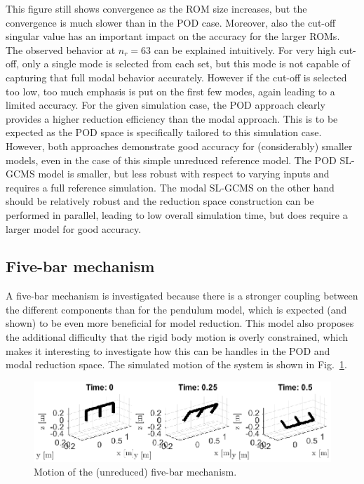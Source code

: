 This figure still shows convergence as the ROM size increases, but the convergence is much slower than in the POD case. Moreover, also the cut-off singular value has an important impact on the accuracy for the larger ROMs. The observed behavior at $n_r=63$ can be explained intuitively. For very high cut-off, only a single mode is selected from each set, but this mode is not capable of capturing that full modal behavior accurately. However if the cut-off is selected too low, too much emphasis is put on the first few modes, again leading to a limited accuracy. 
For the given simulation case, the POD approach clearly provides a higher reduction efficiency than the modal approach. This is to be expected as the POD space is specifically tailored to this simulation case. However, both approaches demonstrate good accuracy for (considerably) smaller models, even in the case of this simple unreduced reference model. The POD SL-GCMS model is smaller, but less robust with respect to varying inputs and requires a full reference simulation. The modal SL-GCMS on the other hand should be relatively robust and the reduction space construction can be performed in parallel, leading to low overall simulation time, but does require a larger model for good accuracy. 

\subsection{Five-bar mechanism}
A five-bar mechanism is investigated because there is a stronger coupling between the different components than for the pendulum model, which is expected (and shown) to be even more beneficial for model reduction. This model also proposes the additional difficulty that the rigid body motion is overly constrained, which makes it interesting to investigate how this can be handles in the POD and modal reduction space. The simulated motion of the system is shown in Fig.~\ref{fig:FiveBar}.
\begin{figure}[htp]
\centering
\includegraphics[bb= 1cm 1cm 14cm 4cm, clip, scale=1]{FiveBar.eps} 
\caption{Motion of the (unreduced) five-bar mechanism.}
\label{fig:FiveBar}
\end{figure}

